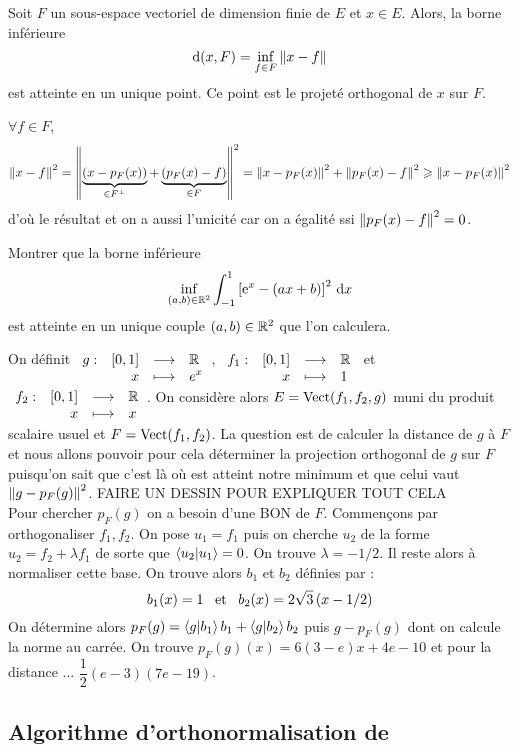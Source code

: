 \documentclass{magnolia}
\begin{document}
\begin{proposition}[utile=3]
Soit $F$ un sous-espace vectoriel de dimension finie de $E$ et $x\in E$. Alors, la borne
inférieure
\[{\rm d}(x,F)=\inf_{f\in F} \left\|x-f\right\|\]
est atteinte en un unique point. Ce point est le projeté orthogonal de $x$ sur $F$.  
\end{proposition}

\begin{preuve}
$\forall f \in F$, $$\left\|x-f\right\|^2=\left\|\underbrace{(x-p_F(x))}_{\in F^\perp}+\underbrace{\left(p_F(x)-f\right)}_{\in F}\right\|^2=\left\|x-p_F(x)\right\|^2+\left\|p_F(x)-f\right\|^2\geqslant \left\|x-p_F(x)\right\|^2$$ d'où le résultat et on a aussi l'unicité car on a égalité ssi $\left\|p_F(x)-f\right\|^2=0$.
\end{preuve}

\begin{exoUnique}
\exo Montrer que la borne inférieure
  \[\inf_{(a,b)\in\mathbb{R}^2} \int_{-1}^{1} \left[{\rm e}^x-\left(ax+b\right)\right]^2\,\text{d}x\]
  est atteinte en un unique couple $(a,b)\in\mathbb{R}^2$ que l'on calculera.
  \begin{sol}
  On définit $\begin{array}[t]{lrcl} \displaystyle{g} : & \displaystyle{\left[0,1\right]} & \longrightarrow & \displaystyle{\mathbb{R}} \\ & \displaystyle{x} & \longmapsto & \displaystyle{e^x} \end{array}$, $\begin{array}[t]{lrcl} \displaystyle{f_1} : & \displaystyle{\left[0,1\right]} & \longrightarrow & \displaystyle{\mathbb{R}} \\ & \displaystyle{x} & \longmapsto & \displaystyle{1} \end{array}$ et $\begin{array}[t]{lrcl} \displaystyle{f_2} : & \displaystyle{\left[0,1\right]} & \longrightarrow & \displaystyle{\mathbb{R}} \\ & \displaystyle{x} & \longmapsto & \displaystyle{x} \end{array}$. On considère alors $E=\operatorname{Vect}(f_1,f_2,g)$ muni du produit scalaire usuel et $F=\operatorname{Vect}(f_1,f_2)$. La question est de calculer la distance de $g$ à $F$ et nous allons pouvoir pour cela déterminer la projection orthogonal de $g$ sur $F$ puisqu'on sait que c'est là où est atteint notre minimum et que celui vaut $\left\|g-p_F(g)\right\|^2$. FAIRE UN DESSIN POUR EXPLIQUER TOUT CELA\\
  Pour chercher $p_F(g)$ on a besoin d'une BON de $F$. Commençons par orthogonaliser $f_1,f_2$. On pose $u_1=f_1$ puis on cherche $u_2$ de la forme $u_2=f_2+\lambda f_1$ de sorte que $\left\langle {u_2}\middle|{u_1}\right\rangle=0$. On trouve $\lambda=-1/2$. Il reste alors à normaliser cette base. On trouve alors $b_1$ et $b_2$ définies par :
  \[b_1(x)=1 \quad\!\text{et}\quad\! b_2(x)=2\sqrt{3}\left(x-1/2\right)\]
  On détermine alors $p_F(g)=\left\langle {g}\middle|{b_1}\right\rangle b_1+\left\langle {g}\middle|{b_2}\right\rangle b_2$ puis $g-p_F(g)$ dont on calcule la norme au carrée. On trouve $p_F(g)(x)=6(3-e)x+4e-10$ et pour la distance ... $\dfrac{1}{2}(e-3)(7e-19)$.
  \end{sol}  
\end{exoUnique}

\subsection{Algorithme d'orthonormalisation de }
\end{document}
